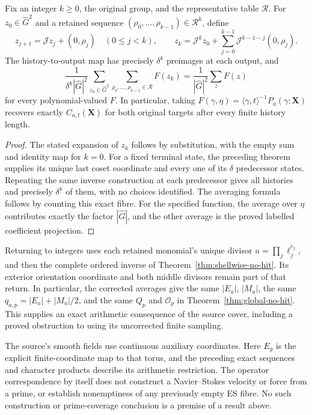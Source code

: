 \begin{corollary}
\label{cor:ns-finite-history-sieve}
Fix an integer $k\geq0$, the original group, and the representative
table $\mathcal R$. For $z_0\in\widehat G^2$ and a retained
sequence $(\rho_0,\ldots,\rho_{k-1})\in\mathcal R^k$, define
\[
 z_{j+1}=\mathcal J z_j+(0,\rho_j)\quad(0\leq j<k),\qquad
 z_k=\mathcal J^k z_0+
       \sum_{j=0}^{k-1}\mathcal J^{k-1-j}(0,\rho_j).
\]
The history-to-output map has precisely $\delta^k$ preimages at
each output, and
\[
 \frac1{\delta^k|\widehat G|^2}
   \sum_{z_0\in\widehat G^2}\sum_{\rho_0,\ldots,\rho_{k-1}\in\mathcal R}
      F(z_k)
       =\frac1{|\widehat G|^2}\sum_zF(z)
\]
for every polynomial-valued $F$. In particular, taking
$F(\gamma,\eta)=\langle\gamma,t\rangle^{-1}P_a(\gamma;\mathbf X)$
recovers exactly $C_{a,t}(\mathbf X)$ for both original targets
after every finite history length.
\end{corollary}
\begin{proof}
The stated expansion of $z_k$ follows by substitution, with the
empty sum and identity map for $k=0$. For a fixed terminal state,
the preceding theorem supplies its unique last coset coordinate
and every one of its $\delta$ predecessor states. Repeating the
same inverse construction at each predecessor gives all histories
and precisely $\delta^k$ of them, with no choices identified.
The averaging formula follows by counting this exact fibre.
For the specified function, the average over $\eta$ contributes
exactly the factor $|\widehat G|$, and the other average is the
proved labelled coefficient projection.
\end{proof}

Returning to integers uses each retained monomial's unique divisor
$u=\prod_j\ell_j^{e_j}$, and then the complete ordered inverse of
Theorem~\ref{thm:shellwise-no-hit}. Its exterior orientation coordinate
and both middle divisors remain part of that return. In particular,
the corrected averages give the same $|E_a|$, $|M_a|$, the same
$q_{a,p}=|E_a|+|M_a|/2$, and the same $Q_p$ and $\mathcal O_p$
in Theorem~\ref{thm:global-no-hit}. This supplies an exact arithmetic
consequence of the source cover, including a proved obstruction to
using its uncorrected finite sampling.

The source's smooth fields use continuous auxiliary coordinates.
Here $E_g$ is the explicit finite-coordinate map to that torus, and
the preceding exact sequences and character products describe its
arithmetic restriction. The operator correspondence by itself does
not construct a Navier--Stokes velocity or force from a prime, or
establish nonemptiness of any previously empty ES fibre. No such
construction or prime-coverage conclusion is a premise of a result
above.
